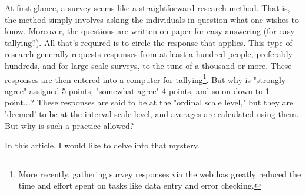 \documentclass{ltjsbook}
\begin{document}
At first glance, a survey seems like a straightforward research method. That is, the method simply involves asking the individuals in question what one wishes to know. Moreover, the questions are written on paper for easy answering (for easy tallying?). All that's required is to circle the response that applies. This type of research generally requests responses from at least a hundred people, preferably hundreds, and for large scale surveys, to the tune of a thousand or more. These responses are then entered into a computer for tallying\footnote{More recently, gathering survey responses via the web has greatly reduced the time and effort spent on tasks like data entry and error checking.}. But why is "strongly agree" assigned 5 points, "somewhat agree" 4 points, and so on down to 1 point...? These responses are said to be at the "ordinal scale level," but they are 'deemed' to be at the interval scale level, and averages are calculated using them. But why is such a practice allowed?

In this article, I would like to delve into that mystery.
\end{document}
